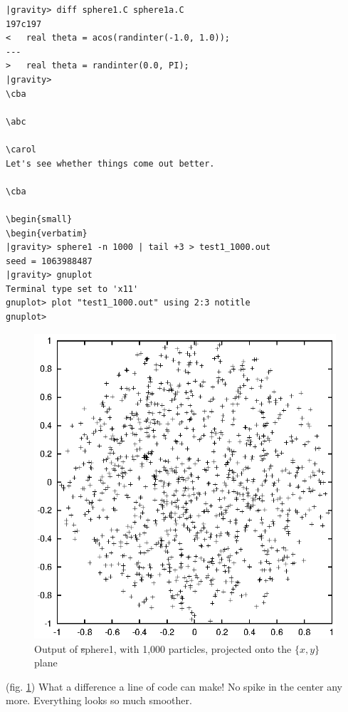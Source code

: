 \cba

\begin{small}
\begin{verbatim}
|gravity> diff sphere1.C sphere1a.C
197c197
< 	real theta = acos(randinter(-1.0, 1.0));
---
> 	real theta = randinter(0.0, PI);
|gravity> 
\cba

\abc

\carol
Let's see whether things come out better.

\cba

\begin{small}
\begin{verbatim}
|gravity> sphere1 -n 1000 | tail +3 > test1_1000.out
seed = 1063988487
|gravity> gnuplot
Terminal type set to 'x11'
gnuplot> plot "test1_1000.out" using 2:3 notitle
gnuplot>
\end{verbatim}
\end{small}

\begin{figure}[htb]
\centering
\includegraphics[width=4.5in]{chap9/test1xy1000.ps}
\caption[xy plot of {\st sphere1} output]
{Output of {\st sphere1}, with 1,000 particles, projected onto the
$\{x,y\}$ plane}
\label{fig:sphere1xy1000}
\end{figure}

\abc

\bob
(fig. \ref{fig:sphere1xy1000}) 
What a difference a line of code can make!  No spike in the center any
more.  Everything looks so much smoother.

